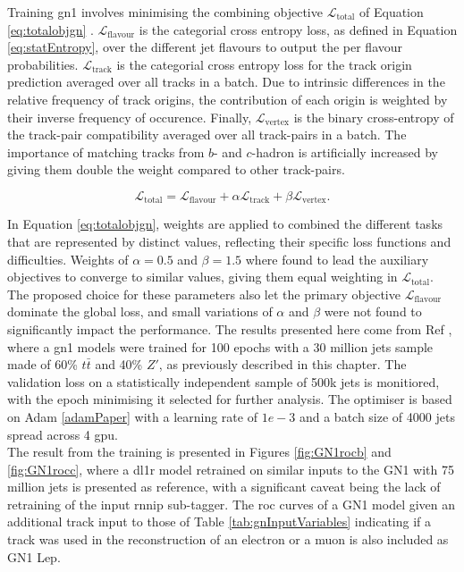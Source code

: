 Training \gls{gn1} involves minimising the combining objective $\mathcal{L}_{\textrm{total}}$ of Equation \ref{eq:totalobjgn} \cite{ATL-PHYS-PUB-2022-027}. $\mathcal{L}_{\textrm{flavour}}$ is the categorial cross entropy loss, as defined in Equation \ref{eq:statEntropy}, over the different jet flavours to output the per flavour probabilities. $\mathcal{L}_{\textrm{track}}$ is the categorial cross entropy loss for the track origin prediction averaged over all tracks in a batch. Due to intrinsic differences in the relative frequency of track origins, the contribution of each origin is weighted by their inverse frequency of occurence. Finally, $\mathcal{L}_{\textrm{vertex}}$ is the binary cross-entropy of the track-pair compatibility averaged over all track-pairs in a batch. The importance of matching tracks from $b$- and $c$-hadron is artificially increased by giving them double the weight compared to other track-pairs.

\begin{equation}\label{eq:totalobjgn}
  \mathcal{L}_{\textrm{total}} = \mathcal{L}_{\textrm{flavour}} + \alpha \mathcal{L}_{\textrm{track}} + \beta \mathcal{L}_{\textrm{vertex}}.
\end{equation}

In Equation \ref{eq:totalobjgn}, weights are applied to combined the different tasks that are represented by distinct values, reflecting their specific loss functions and difficulties. Weights of $\alpha = 0.5$ and $\beta = 1.5$ \cite{ATL-PHYS-PUB-2022-027} where found to lead the auxiliary objectives to converge to similar values, giving them equal weighting in $\mathcal{L}_{\textrm{total}}$. The proposed choice for these parameters also let the primary objective $\mathcal{L}_{\textrm{flavour}}$ dominate the global loss, and small variations of $\alpha$ and $\beta$ were not found to significantly impact the performance. The results presented here come from Ref \cite{ATL-PHYS-PUB-2022-027}, where a \gls{gn1} models were trained for 100 epochs with a 30 million jets sample made of 60\% $t\bar{t}$ and 40\% $Z'$, as previously described in this chapter. The validation loss on a statistically independent sample of 500k jets is monitiored, with the epoch minimising it selected for further analysis. The optimiser is based on Adam \ref{adamPaper} with a learning rate of $1e-3$ and a batch size of 4000 jets spread across 4 \gls{gpu}. \\

The result from the training is presented in Figures \ref{fig:GN1rocb} and \ref{fig:GN1rocc}, where a \gls{dl1r} model retrained on similar inputs to the GN1 with 75 million jets is presented as reference, with a significant caveat being the lack of retraining of the input \gls{rnnip} sub-tagger. The \gls{roc} curves of a GN1 model given an additional track input to those of Table \ref{tab:gnInputVariables} indicating if a track was used in the reconstruction of an electron or a muon is also included as GN1 Lep.


